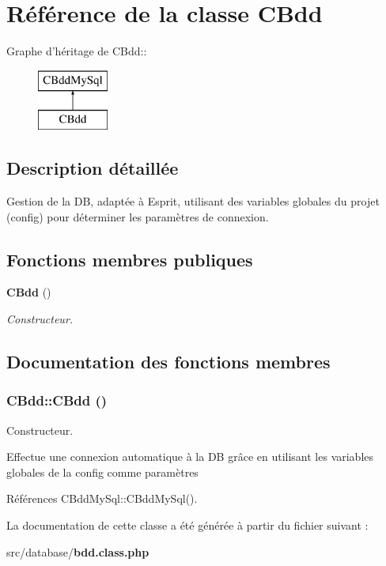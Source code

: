 \section{Référence de la classe CBdd}
\label{class_c_bdd}
Graphe d'héritage de CBdd::\begin{figure}[H]
\begin{center}
\leavevmode
\includegraphics[height=2cm]{class_c_bdd}
\end{center}
\end{figure}


\subsection{Description détaillée}
Gestion de la DB, adaptée à Esprit, utilisant des variables globales du projet (config) pour déterminer les paramètres de connexion. \subsection*{Fonctions membres publiques}
\begin{CompactItemize}
\item 
{\bf CBdd} ()
\begin{CompactList}\small\item\em Constructeur. \item\end{CompactList}\end{CompactItemize}


\subsection{Documentation des fonctions membres}
\subsubsection{\setlength{\rightskip}{0pt plus 5cm}CBdd::CBdd ()}\label{class_c_bdd_4f77ce242d778ba4ff89f8c54002b2e6}


Constructeur. 

Effectue une connexion automatique à la DB grâce en utilisant les variables globales de la config comme paramètres 

Références CBddMySql::CBddMySql().

La documentation de cette classe a été générée à partir du fichier suivant :\begin{CompactItemize}
\item 
src/database/{\bf bdd.class.php}\end{CompactItemize}
